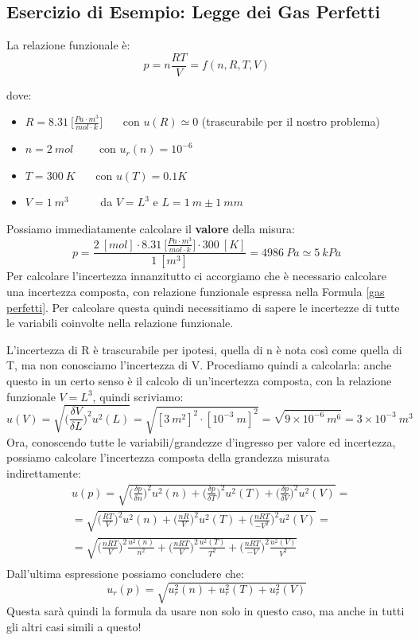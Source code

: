 \documentclass[a4paper,11pt]{report}
\begin{document}
\subsection{Esercizio di Esempio: Legge dei Gas Perfetti}
La relazione funzionale è:
\begin{equation}
  \label{gas perfetti}
  p = n \frac{RT}{V} = f (n,R,T,V)
\end{equation}

dove:
\begin{itemize}
  \item $R = 8.31~\Bigg[\frac{Pa\cdot m^3}{mol\cdot k}\Bigg]$~~~ con $u(R) \simeq 0$ (trascurabile per il nostro problema)
  \item $n = 2~mol$~~~~ con $u_r(n) = 10^{-6}$
  \item $T = 300~K$~~~ con $u(T) = 0.1 K$
  \item $V = 1~m^3$~~~~~ da $V = L^3$ e $L = 1~m\pm 1~mm$
\end{itemize}
Possiamo immediatamente calcolare il \textbf{valore} della misura:
$$
  p = \frac{2~[mol]\cdot 8.31~\Bigg[\frac{Pa\cdot m^3}{mol\cdot k}\Bigg]\cdot 300~[K]}{1~[m^3]} = 4986~Pa \simeq 5~kPa
$$
Per calcolare l'incertezza innanzitutto ci accorgiamo che è necessario calcolare una incertezza composta, con relazione funzionale espressa nella Formula \ref{gas perfetti}. Per calcolare questa quindi necessitiamo di sapere le incertezze di tutte le variabili coinvolte nella relazione funzionale.

L'incertezza di R è trascurabile per ipotesi, quella di n è nota così come quella di T, ma non conosciamo l'incertezza di V. Procediamo quindi a calcolarla: anche questo in un certo senso è il calcolo di un'incertezza composta, con la relazione funzionale $ V = L^3 $, quindi scriviamo:
$$
  u(V) = \sqrt{\Bigg(\frac{\delta V}{\delta L}\Bigg)^2 u^2(L)} = \sqrt{[3~m^2]^2\cdot[10^{-3}~m]^2} = \sqrt{9\times 10^{-6}~m^6} = 3\times 10^{-3}~ m^3
$$
Ora, conoscendo tutte le variabili/grandezze d'ingresso per valore ed incertezza, possiamo calcolare l'incertezza composta della grandezza misurata indirettamente:
\begin{align*}
&u(p) = \sqrt{\Bigg(\frac{\delta p}{\delta n}\Bigg)^2 u^2(n)+\Bigg(\frac{\delta p}{\delta T}\Bigg)^2 u^2(T)+\Bigg(\frac{\delta p}{\delta V}\Bigg)^2 u^2(V)} =\\
&= \sqrt{\Bigg(\frac{RT}{V}\Bigg)^2 u^2(n)+\Bigg(\frac{nR}{V}\Bigg)^2 u^2(T)+\Bigg(\frac{nRT}{-V^2}\Bigg)^2 u^2(V)} =\\
&= \sqrt{\Bigg(\frac{nRT}{V}\Bigg)^2 \frac{u^2(n)}{n^2}+\Bigg(\frac{nRT}{V}\Bigg)^2 \frac{u^2(T)}{T^2}+\Bigg(\frac{nRT}{-V}\Bigg)^2 \frac{u^2(V)}{V^2}}\\
\end{align*}
Dall'ultima espressione possiamo concludere che:
\begin{equation}
\label{formula incertezza composta}
  u_r(p) = \sqrt{u_r^2(n)+u_r^2(T)+u_r^2(V)}
\end{equation}
Questa sarà quindi la formula da usare non solo in questo caso, ma anche in tutti gli altri casi simili a questo!
\end{document}

